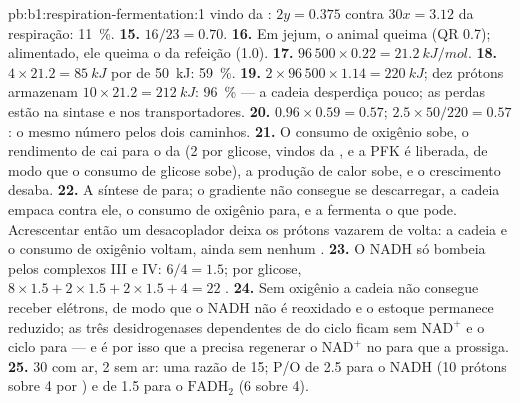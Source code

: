 \begin{solution}{pb:b1:respiration-fermentation:1}
vindo da : $2y = 0.375$ contra $30x = 3.12$ da respiração:
\qty{11}{\%}.
\textbf{15.} $16/23 = 0.70$.
\textbf{16.} Em jejum, o animal queima  (QR 0.7); alimentado, ele
queima o  da refeição (1.0).
\textbf{17.} $96\,500\times 0.22 = \qty{21.2}{kJ/mol}$.
\textbf{18.} $4\times 21.2 = \qty{85}{kJ}$ por  de \qty{50}{kJ}:
\qty{59}{\%}.
\textbf{19.} $2\times 96\,500\times 1.14 = \qty{220}{kJ}$; dez prótons
armazenam $10\times 21.2 = \qty{212}{kJ}$: \qty{96}{\%} --- a cadeia
desperdiça pouco; as perdas estão na sintase e nos transportadores.
\textbf{20.} $0.96\times 0.59 = 0.57$; $2.5\times 50/220 = 0.57$: o
mesmo número pelos dois caminhos.
\textbf{21.} O consumo de oxigênio sobe, o rendimento de  cai para o
da  (2 por glicose, vindos da , e a PFK é liberada,
de modo que o consumo de glicose sobe), a produção de calor sobe, e o
crescimento desaba.
\textbf{22.} A síntese de  para; o gradiente não consegue se
descarregar, a cadeia empaca contra ele, o consumo de oxigênio para, e a
 fermenta o que pode. Acrescentar então um desacoplador deixa os
prótons vazarem de volta: a cadeia e o consumo de oxigênio voltam, ainda
sem nenhum .
\textbf{23.} O NADH só bombeia pelos complexos III e IV: $6/4 = 1.5$;
por glicose, $8\times 1.5 + 2\times 1.5 + 2\times 1.5 + 4 = 22$ .
\textbf{24.} Sem oxigênio a cadeia não consegue receber elétrons, de
modo que o NADH não é reoxidado e o estoque permanece reduzido; as três
desidrogenases dependentes de  do ciclo ficam sem $\mathrm{NAD^+}$ e
o ciclo para --- e é por isso que a  precisa regenerar o
$\mathrm{NAD^+}$ no  para que a  prossiga.
\textbf{25.} 30  com ar, 2 sem ar: uma razão de 15; P/O de 2.5 para o
NADH (10 prótons sobre 4 por ) e de 1.5 para o $\mathrm{FADH_2}$ (6
sobre 4).
\end{solution}
